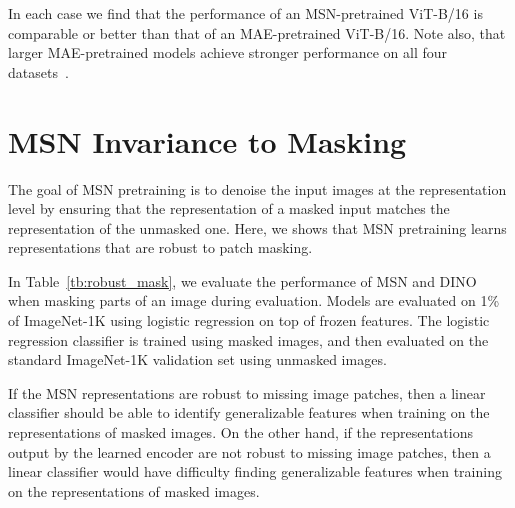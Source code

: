 \documentclass{article}
\begin{document}
In each case we find that the performance of an MSN-pretrained ViT-B/16 is comparable or better than that of an MAE-pretrained ViT-B/16. Note also, that larger MAE-pretrained models achieve stronger performance on all four datasets~\citep{he2021masked}.

\section{MSN Invariance to Masking}
\label{apndx:representation _properties}


The goal of MSN pretraining is to denoise the input images at the representation level by ensuring that the representation of a masked input matches the representation of the unmasked one.
Here, we shows that MSN pretraining learns representations that are robust to patch masking.

In Table~\ref{tb:robust_mask}, we evaluate the performance of MSN and DINO when masking parts of an image during evaluation.
Models are evaluated on 1\% of ImageNet-1K using logistic regression on top of frozen features.
The logistic regression classifier is trained using masked images, and then evaluated on the standard ImageNet-1K validation set using unmasked images.

If the MSN representations are robust to missing image patches, then a linear classifier should be able to identify generalizable features when training on the representations of masked images.
On the other hand, if the representations output by the learned encoder are not robust to missing image patches, then a linear classifier would have difficulty finding generalizable features when training on the representations of masked images.
\end{document}
